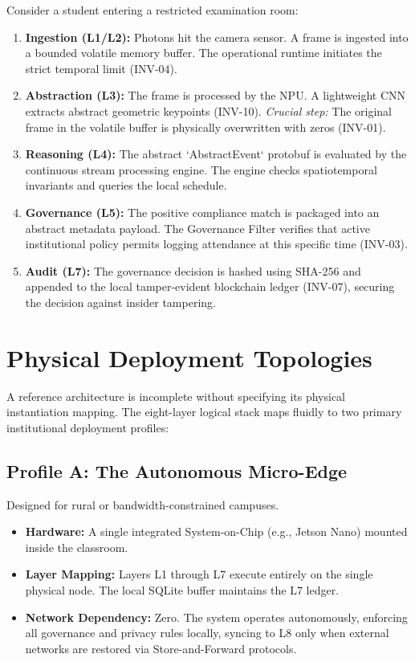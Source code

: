 \documentclass[conference]{IEEEtran}
\begin{document}
Consider a student entering a restricted examination room:
\begin{enumerate}
    \item \textbf{Ingestion (L1/L2):} Photons hit the camera sensor. A frame is ingested into a bounded volatile memory buffer. The operational runtime initiates the strict temporal limit (INV-04).
    \item \textbf{Abstraction (L3):} The frame is processed by the NPU. A lightweight CNN extracts abstract geometric keypoints (INV-10). \textit{Crucial step:} The original frame in the volatile buffer is physically overwritten with zeros (INV-01).
    \item \textbf{Reasoning (L4):} The abstract `AbstractEvent` protobuf is evaluated by the continuous stream processing engine. The engine checks spatiotemporal invariants and queries the local schedule.
    \item \textbf{Governance (L5):} The positive compliance match is packaged into an abstract metadata payload. The Governance Filter verifies that active institutional policy permits logging attendance at this specific time (INV-03).
    \item \textbf{Audit (L7):} The governance decision is hashed using SHA-256 and appended to the local tamper-evident blockchain ledger (INV-07), securing the decision against insider tampering.
\end{enumerate}

\section{Physical Deployment Topologies}
A reference architecture is incomplete without specifying its physical instantiation mapping. The eight-layer logical stack maps fluidly to two primary institutional deployment profiles:

\subsection{Profile A: The Autonomous Micro-Edge}
Designed for rural or bandwidth-constrained campuses.
\begin{itemize}
    \item \textbf{Hardware:} A single integrated System-on-Chip (e.g., Jetson Nano) mounted inside the classroom.
    \item \textbf{Layer Mapping:} Layers L1 through L7 execute entirely on the single physical node. The local SQLite buffer maintains the L7 ledger.
    \item \textbf{Network Dependency:} Zero. The system operates autonomously, enforcing all governance and privacy rules locally, syncing to L8 only when external networks are restored via Store-and-Forward protocols.
\end{itemize}
\end{document}
